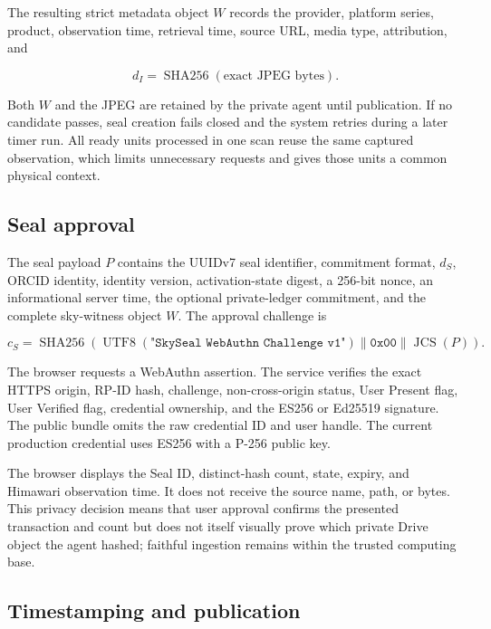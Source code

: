 \documentclass[11pt,a4paper]{article}
\newcommand{\sha}{\operatorname{SHA256}}
\newcommand{\jcs}{\operatorname{JCS}}
\begin{document}
The resulting strict metadata object $W$ records the provider, platform series, product, observation time, retrieval time, source URL, media type, attribution, and

\begin{equation}
d_I = \sha(\text{exact JPEG bytes}).
\end{equation}

Both $W$ and the JPEG are retained by the private agent until publication. If no candidate passes, seal creation fails closed and the system retries during a later timer run. All ready units processed in one scan reuse the same captured observation, which limits unnecessary requests and gives those units a common physical context.

\subsection{Seal approval}

The seal payload $P$ contains the UUIDv7 seal identifier, commitment format, $d_S$, ORCID identity, identity version, activation-state digest, a 256-bit nonce, an informational server time, the optional private-ledger commitment, and the complete sky-witness object $W$. The approval challenge is

\begin{equation}
c_S = \sha\!\left(
  \operatorname{UTF8}(\texttt{"SkySeal WebAuthn Challenge v1"})
  \parallel \mathtt{0x00} \parallel \jcs(P)
\right).
\end{equation}

The browser requests a WebAuthn assertion. The service verifies the exact HTTPS origin, RP-ID hash, challenge, non-cross-origin status, User Present flag, User Verified flag, credential ownership, and the ES256 or Ed25519 signature. The public bundle omits the raw credential ID and user handle. The current production credential uses ES256 with a P-256 public key.

The browser displays the Seal ID, distinct-hash count, state, expiry, and Himawari observation time. It does not receive the source name, path, or bytes. This privacy decision means that user approval confirms the presented transaction and count but does not itself visually prove which private Drive object the agent hashed; faithful ingestion remains within the trusted computing base.

\subsection{Timestamping and publication}
\end{document}
